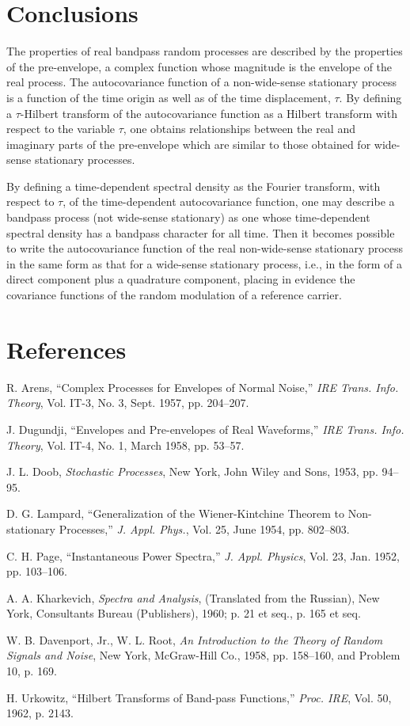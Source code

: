 \documentclass[12pt]{article}
\begin{document}
\section{Conclusions}
The properties of real bandpass random processes are described by the properties of the pre-envelope, a complex function whose magnitude is the envelope of the real process. The autocovariance function of a non-wide-sense stationary process is a function of the time origin as well as of the time displacement, $\tau$. By defining a $\tau$-Hilbert transform of the autocovariance function as a Hilbert transform with respect to the variable $\tau$, one obtains relationships between the real and imaginary parts of the pre-envelope which are similar to those obtained for wide-sense stationary processes.

By defining a time-dependent spectral density as the Fourier transform, with respect to $\tau$, of the time-dependent autocovariance function, one may describe a bandpass process (not wide-sense stationary) as one whose time-dependent spectral density has a bandpass character for all time. Then it becomes possible to write the autocovariance function of the real non-wide-sense stationary process in the same form as that for a wide-sense stationary process, i.e., in the form of a direct component plus a quadrature component, placing in evidence the covariance functions of the random modulation of a reference carrier.

\section*{References}
\begin{thebibliography}{8}
R. Arens, ``Complex Processes for Envelopes of Normal Noise,'' \emph{IRE Trans. Info. Theory}, Vol. IT-3, No. 3, Sept. 1957, pp. 204--207.

J. Dugundji, ``Envelopes and Pre-envelopes of Real Waveforms,'' \emph{IRE Trans. Info. Theory}, Vol. IT-4, No. 1, March 1958, pp. 53--57.

J. L. Doob, \emph{Stochastic Processes}, New York, John Wiley and Sons, 1953, pp. 94--95.

D. G. Lampard, ``Generalization of the Wiener-Kintchine Theorem to Non-stationary Processes,'' \emph{J. Appl. Phys.}, Vol. 25, June 1954, pp. 802--803.

C. H. Page, ``Instantaneous Power Spectra,'' \emph{J. Appl. Physics}, Vol. 23, Jan. 1952, pp. 103--106.

A. A. Kharkevich, \emph{Spectra and Analysis}, (Translated from the Russian), New York, Consultants Bureau (Publishers), 1960; p. 21 et seq., p. 165 et seq.

W. B. Davenport, Jr., W. L. Root, \emph{An Introduction to the Theory of Random Signals and Noise}, New York, McGraw-Hill Co., 1958, pp. 158--160, and Problem 10, p. 169.

H. Urkowitz, ``Hilbert Transforms of Band-pass Functions,'' \emph{Proc. IRE}, Vol. 50, 1962, p. 2143.
\end{thebibliography}
\end{document}
